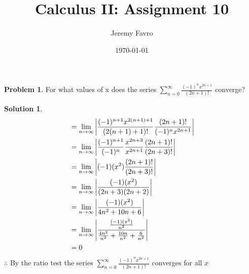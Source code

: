 \documentclass[10pt]{article}
\title{Calculus II: Assignment 10}
\author{Jeremy Favro}
\date{\today}
\theoremstyle{definition}
\newtheorem{problem}{Problem}
\newtheorem{soln}{Solution}
\begin{document}
\maketitle

\begin{problem}
For what values of x does the series $\displaystyle \sum_{n = 0}^{\infty} \frac{(-1)^nx^{2n+1}}{(2n+1)!}$ converge?
\end{problem}
\begin{soln}
      \begin{align*}
             & = \lim_{n \to \infty} \abs{\frac{(-1)^{n+1}x^{2(n+1)+1}}{(2(n+1)+1)!}\frac{(2n+1)!}{(-1)^nx^{2n+1}}}     \\
             & = \lim_{n \to \infty} \abs{\frac{(-1)^{n+1}}{(-1)^n}\frac{x^{2n+3}}{x^{2n+1}}\frac{(2n+1)!}{(2n+3)!}}    \\
             & = \lim_{n \to \infty} \abs{(-1)(x^2)\frac{(2n+1)!}{(2n+3)!}}                                             \\
             & = \lim_{n \to \infty} \abs{\frac{(-1)(x^2)}{(2n+3)(2n+2)}}                                               \\
             & = \lim_{n \to \infty} \abs{\frac{(-1)(x^2)}{4n^2+10n+6}}                                                 \\
             & = \lim_{n \to \infty} \abs{\frac{\frac{(-1)(x^2)}{n^2}}{\frac{4n^2}{n^2}+\frac{10n}{n^2}+\frac{6}{n^2}}} \\
             & = 0
      \end{align*}
      \noindent $\therefore$ By the ratio test the series $\displaystyle \sum_{n = 0}^{\infty} \frac{(-1)^nx^{2n+1}}{(2n+1)!}$ converges for all $x$
\end{soln}
\end{document}
